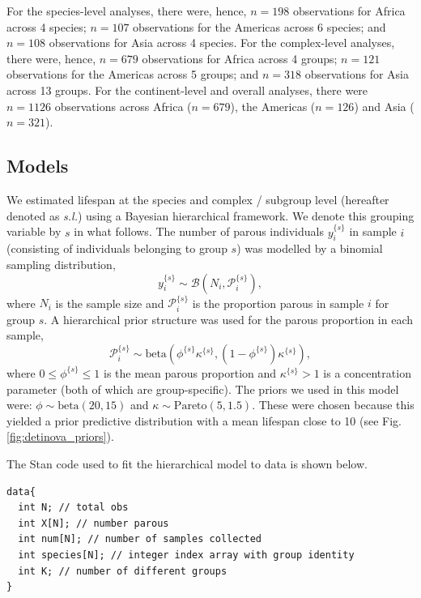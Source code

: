\documentclass[12pt]{article}
\begin{document}
{For the species-level analyses, there were, hence, $n=198$ observations for Africa across 4 species; $n=107$ observations for the Americas across 6 species; and $n=108$ observations for Asia across 4 species. For the complex-level analyses, there were, hence, $n=679$ observations for Africa across 4 groups; $n=121$ observations for the Americas across 5 groups; and $n=318$ observations for Asia across 13 groups. For the continent-level and overall analyses, there were $n=1126$ observations across Africa ($n=679$), the Americas ($n=126$) and Asia ($n=321$).


\subsection{Models}\label{sec:detinova_datamodel}
We estimated lifespan at the species and complex / subgroup level (hereafter denoted as \textit{s.l.}) using a Bayesian hierarchical framework. We denote this grouping variable by $s$ in what follows. The number of parous individuals $y_i^{\{s\}}$ in sample $i$ (consisting of individuals belonging to group $s$) was modelled by a binomial sampling distribution,
%
\begin{equation}
y_i^{\{s\}} \sim \mathcal{B}(N_i, \mathcal{P}_i^{\{s\}}),
\end{equation}
%
where $N_i$ is the sample size and $\mathcal{P}_i^{\{s\}}$ is the proportion parous in sample $i$ for group $s$. A hierarchical prior structure was used for the parous proportion in each sample,
%
\begin{equation}\label{eq:detinova_prior}
\mathcal{P}_i^{\{s\}}\sim \text{beta}\left(\phi^{\{s\}} \kappa^{\{s\}}, (1-\phi^{\{s\}})\kappa^{\{s\}}\right),
\end{equation}
%
where $0\leq\phi^{\{s\}}\leq 1$ is the mean parous proportion and $\kappa^{\{s\}}>1$ is a concentration parameter (both of which are group-specific). The priors we used in this model were: $\phi\sim \text{beta}(20, 15)$ and $\kappa\sim \text{Pareto}(5, 1.5)$. These were chosen because this yielded a prior predictive distribution with a mean lifespan close to 10 (see Fig. \ref{fig:detinova_priors}).

The Stan code used to fit the hierarchical model to data is shown below.

\begin{verbatim}
data{
  int N; // total obs
  int X[N]; // number parous
  int num[N]; // number of samples collected
  int species[N]; // integer index array with group identity
  int K; // number of different groups
}


\end{verbatim}}
\end{document}
